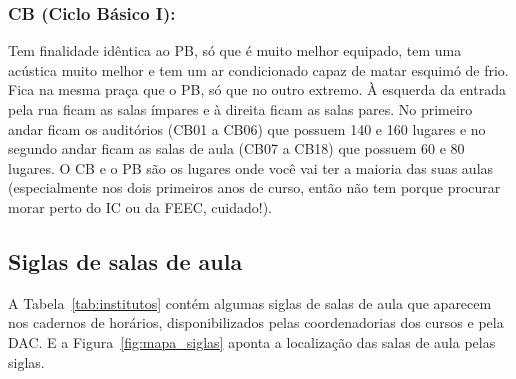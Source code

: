 \subsubsection{CB (Ciclo Básico I):} Tem finalidade idêntica ao PB, só que é
muito melhor equipado, tem uma acústica muito melhor e tem um ar condicionado
capaz de matar esquimó de frio. Fica na mesma praça que o PB, só que no outro
extremo. À esquerda da entrada pela rua ficam as salas ímpares e à direita
ficam as salas pares. No primeiro andar ficam os auditórios (CB01 a CB06) que
possuem 140 e 160 lugares e no segundo andar ficam as salas de aula (CB07 a
CB18) que possuem 60 e 80 lugares.  O CB e o PB são os lugares onde você vai
ter a maioria das suas aulas (especialmente nos dois primeiros anos de curso,
então não tem porque procurar morar perto do IC ou da FEEC, cuidado!).

\subsection{Siglas de salas de aula}

A Tabela~\ref{tab:institutos} contém algumas siglas de salas de aula que
aparecem nos cadernos de horários, disponibilizados pelas coordenadorias dos
cursos e pela DAC. E a Figura~\ref{fig:mapa_siglas} aponta a localização das
salas de aula pelas siglas.

